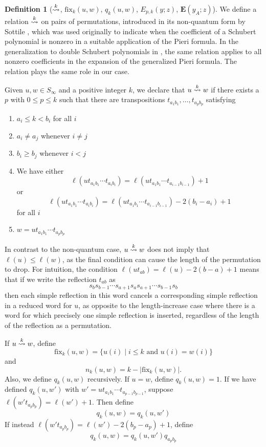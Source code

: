 \documentclass{amsart}
\theoremstyle{definition}
\newtheorem{definition}[lemma]{Definition}
\theoremstyle{remark}
\numberwithin{equation}{section}
\newcommand{\xrightsquigarrow}[2][]{%
	\mathrel{\mathop{\rightsquigarrow}\limits^{\scriptstyle #2}%
	\ifx\hfuzz#1\hfuzz\else_{\scriptstyle #1}\fi}%
}
\newcommand{\tom}[1]{\ensuremath{\xrightsquigarrow{#1}}}
\newcommand{\fx}{\mathrm{fix}}
\newcommand{\wte}{\mathbf{E}}
\begin{document}
\begin{definition}[$\tom{k}$, $\fx_{k}(u,w)$, $q_k(u,w)$, $E_{p,k}(y;z)$, $\wte(y_A;z)$] \label{definition:pieri}
We define a relation $\tom{k}$ on pairs of permutations, introduced in its non-quantum form by Sottile \cite{sottile}, which was used originally to indicate when the coefficient of a Schubert polynomial is nonzero in a suitable application of the Pieri formula. In the generalization to double Schubert polynomials in \cite{samuelmolev}, the same relation applies to all nonzero coefficients in the expansion of the generalized Pieri formula. The relation plays the same role in our case. 

Given $u,w\in S_\infty$ and a positive integer $k$, we declare that $u\tom{k} w$ if there exists a $p$ with $0\leq p\leq k$ such that there are transpositions $t_{a_1b_1},\ldots,t_{a_pb_p}$ satisfying 
\begin{enumerate}
\item $a_i\leq k<b_i$ for all $i$
\item $a_i\neq a_j$ whenever $i\neq j$
\item $b_i\geq b_j$ whenever $i<j$
\item We have either
$$\ell(ut_{a_1b_1}\cdots t_{a_ib_i})=\ell(ut_{a_1b_1}\cdots t_{a_{i-1}b_{i-1}})+1$$ 
or 
$$\ell(ut_{a_1b_1}\cdots t_{a_ib_i})=\ell(ut_{a_1b_1}\cdots t_{a_{i-1}b_{i-1}})-2(b_i-a_i)+1$$
for all $i$
\item $w=ut_{a_1b_1}\cdots t_{a_pb_p}$
\end{enumerate}
In contrast to the non-quantum case, $u\tom{k} w$ does not imply that $\ell(u) \leq \ell(w)$, as the final condition can cause the length of the permutation to drop. For intuition, the condition $\ell(ut_{ab}) = \ell(u) - 2(b - a) + 1$ means that if we write the reflection $t_{ab}$ as
$$s_{b}s_{b-1}\cdots s_{a+1}s_as_{a+1}\cdots s_{b-1}s_b$$
then each simple reflection in this word cancels a corresponding simple reflection in a reduced word for $u$, as opposite to the length-increase case where there is a word for which precisely one simple reflection is inserted, regardless of the length of the reflection as a permutation.

If $u\tom{k} w$, define 
$$\fx_{k}(u,w)=\{u(i)\mid i\leq k\mbox{ and }u(i)=w(i)\}$$
and
$$n_k(u,w)=k-\lvert\fx_k(u,w)\rvert.$$
Also, we define $q_k(u,w)$ recursively. If $u=w$, define $q_k(u,w)=1$. If we have defined $q_k(u,w')$ with $w'=ut_{a_1b_1}\cdots t_{a_{p-1}b_{p-1}}$, suppose $\ell(w't_{a_pb_p})=\ell(w')+1$. Then define
$$q_k(u,w)=q_k(u,w')$$
If instead $\ell(w't_{a_pb_p})=\ell(w')-2(b_p-a_p)+1$, define
$$q_k(u,w)=q_k(u,w')q_{a_pb_p}$$


\end{definition}
\end{document}
